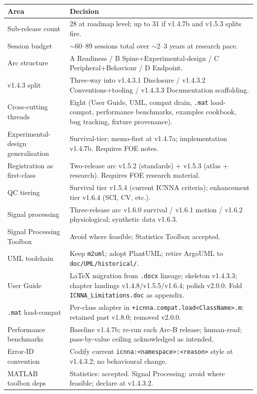 \documentclass[11pt,a4paper]{article}
\begin{document}
\begin{longtable}{p{3.5cm}p{10.5cm}}
\toprule
\textbf{Area} & \textbf{Decision} \\
\midrule
\endhead
Sub-release count & 28 at roadmap level; up to 31 if v1.4.7b and v1.5.3 splits fire. \\
Session budget & $\sim$60--89 sessions total over $\sim$2--3 years at research pace. \\
Arc structure & A Readiness / B Spine+Experimental-design / C Peripheral+Behaviour / D Endpoint. \\
v1.4.3 split & Three-way into v1.4.3.1 Disclosure / v1.4.3.2 Conventions+tooling / v1.4.3.3 Documentation scaffolding. \\
Cross-cutting threads & Eight (User Guide, UML, compat drain, \texttt{.mat} load-compat, performance benchmarks, examples cookbook, bug tracking, fixture provenance). \\
Experimental-design generalisation & Survival-tier; memo-first at v1.4.7a; implementation v1.4.7b. Requires FOE notes. \\
Registration as first-class & Two-release arc v1.5.2 (standards) + v1.5.3 (atlas + research). Requires FOE research material. \\
QC tiering & Survival tier v1.5.4 (current ICNNA criteria); enhancement tier v1.6.4 (SCI, CV, etc.). \\
Signal processing & Three-release arc v1.6.0 survival / v1.6.1 motion / v1.6.2 physiological; synthetic data v1.6.3. \\
Signal Processing Toolbox & Avoid where feasible; Statistics Toolbox accepted. \\
UML toolchain & Keep \texttt{m2uml}; adopt PlantUML; retire ArgoUML to \texttt{doc/UML/historical/}. \\
User Guide & LaTeX migration from \texttt{.docx} lineage; skeleton v1.4.3.3; chapter landings v1.4.8/v1.5.5/v1.6.4; polish v2.0.0. Fold \texttt{ICNNA\_Limitations.doc} as appendix. \\
\texttt{.mat} load-compat & Per-class adapter in \texttt{+icnna.compat.load<ClassName>.m}; retained past v1.8.0; removed v2.0.0. \\
Performance benchmarks & Baseline v1.4.7b; re-run each Arc-B release; human-read; pass-by-value ceiling acknowledged as intended. \\
Error-ID convention & Codify current \texttt{icnna:<namespace>:<reason>} style at v1.4.3.2; no behavioural change. \\
MATLAB toolbox deps & Statistics: accepted. Signal Processing: avoid where feasible; declare at v1.4.3.2. \\

\end{longtable}
\end{document}
